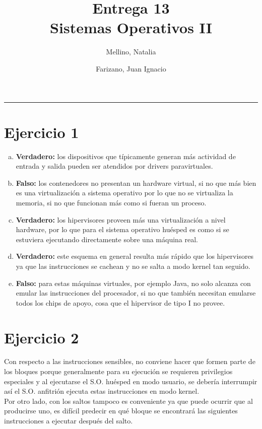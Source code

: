 \documentclass[11pt]{article}
\title{
    Entrega 13 \\
    \large Sistemas Operativos II}
\author{Mellino, Natalia \and Farizano, Juan Ignacio}
\date{}
\begin{document}
\maketitle

\noindent\rule{\textwidth}{1pt}

\section*{Ejercicio 1}
\begin{enumerate}[a)]
  \item \textbf{Verdadero:} los dispositivos que típicamente generan más actividad
  de entrada y salida pueden ser atendidos por drivers paravirtuales.
  \item \textbf{Falso:} los contenedores no presentan un hardware virtual, si no
  que más bien es una virtualización a sistema operativo por lo que no se virtualiza
  la memoria, si no que funcionan más como si fueran un proceso.
  \item \textbf{Verdadero:} los hipervisores proveen más una virtualización a nivel
  hardware, por lo que para el sistema operativo huésped es como si se 
  estuviera ejecutando directamente sobre una máquina real.
  \item \textbf{Verdadero:} este esquema en general resulta más rápido que los hipervisores
  ya que las instrucciones se cachean y no se salta a modo kernel tan seguido.
  \item \textbf{Falso:} para estas máquinas virtuales, por ejemplo Java, no solo
  alcanza con emular las instrucciones del procesador, si no que también necesitan
  emularse todos los chips de apoyo, cosa que el hipervisor de tipo I no provee.
\end{enumerate}

\section*{Ejercicio 2}
Con respecto a las instrucciones sensibles, no conviene hacer que formen parte de 
los bloques porque generalmente para su ejecución se requieren privilegios especiales
y al ejecutarse el S.O. huésped en modo usuario, se debería interrumpir así el
S.O. anfitrión ejecuta estas instrucciones en modo kernel. \\

Por otro lado, con los saltos tampoco es conveniente ya que puede ocurrir que al
producirse uno, es difícil predecir en qué bloque se encontrará las siguientes instrucciones
a ejecutar después del salto.
\end{document}
